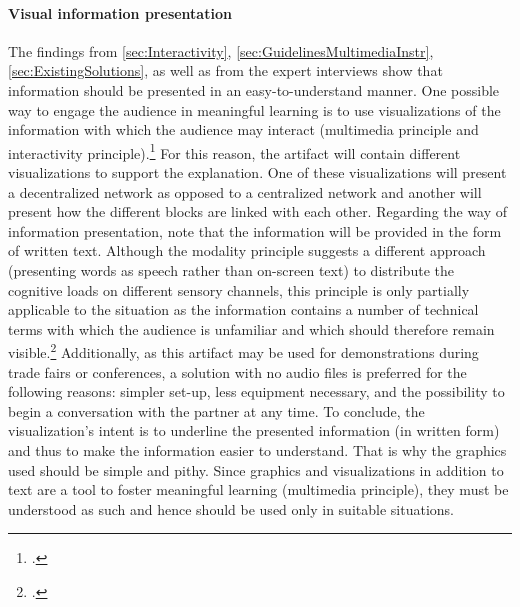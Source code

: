 
\paragraph{Visual information presentation} The findings from \ref{sec:Interactivity}, \ref{sec:GuidelinesMultimediaInstr}, \ref{sec:ExistingSolutions}, as well as from the expert interviews show that information should be presented in an easy-to-understand manner. One possible way to engage the audience in meaningful learning is to use visualizations of the information with which the audience may interact (multimedia principle and interactivity principle).\footcites[Cf.][]{RalphBeckmann_Interview}[cf.][p.1025]{DomagkInteractivitymultimedialearning2010}[cf.][p.311]{MorenoInteractiveMultimodalLearning2007}[cf.][p.290]{Betrancourtanimationinteractivityprinciples2005} For this reason, the artifact will contain different visualizations to support the explanation. One of these visualizations will present a decentralized network as opposed to a centralized network and another will present how the different blocks are linked with each other. Regarding the way of information presentation, note that the information will be provided in the form of written text. Although the modality principle suggests a different approach (presenting words as speech rather than on-screen text) to distribute the cognitive loads on different sensory channels, this principle is only partially applicable to the situation as the information contains a number of technical terms with which the audience is unfamiliar and which should therefore remain visible.\footcite[Cf.][chapter 6, paragraph 1]{ClarkElearningscienceinstruction2016} Additionally, as this artifact may be used for demonstrations during trade fairs or conferences, a solution with no audio files is preferred for the following reasons: simpler set-up, less equipment necessary, and the possibility to begin a conversation with the partner at any time. To conclude, the visualization's intent is to underline the presented information (in written form) and thus to make the information easier to understand. That is why the graphics used should be simple and pithy. Since graphics and visualizations in addition to text are a tool to foster meaningful learning (multimedia principle), they must be understood as such and hence should be used only in suitable situations. 

